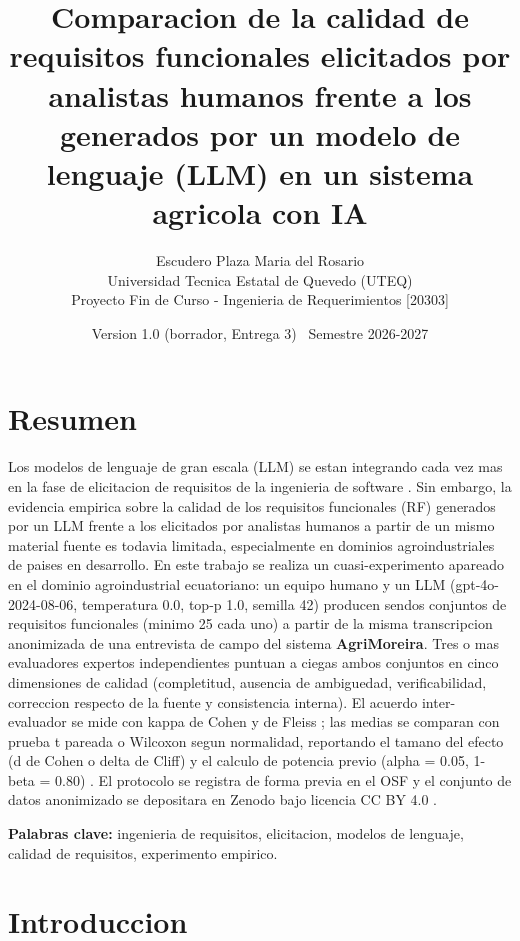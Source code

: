 \documentclass[11pt,a4paper]{article}
\title{\textbf{Comparacion de la calidad de requisitos funcionales elicitados
por analistas humanos frente a los generados por un modelo de lenguaje (LLM)
en un sistema agricola con IA}}
\author{Escudero Plaza Maria del Rosario\\[0.3em]
\small Universidad Tecnica Estatal de Quevedo (UTEQ)\\
\small Proyecto Fin de Curso - Ingenieria de Requerimientos [20303]}
\date{Version 1.0 (borrador, Entrega 3) \textbullet\ Semestre 2026-2027}
\begin{document}
\maketitle

\section*{Resumen}
Los modelos de lenguaje de gran escala (LLM) se estan integrando cada vez mas
en la fase de elicitacion de requisitos de la ingenieria de software
\cite{cheng2026,arora2024}. Sin embargo, la evidencia empirica sobre la
calidad de los requisitos funcionales (RF) generados por un LLM frente a los
elicitados por analistas humanos a partir de un mismo material fuente es
todavia limitada, especialmente en dominios agroindustriales de paises en
desarrollo. En este trabajo se realiza un cuasi-experimento apareado en el
dominio agroindustrial ecuatoriano: un equipo humano y un LLM (gpt-4o-2024-08-06,
temperatura 0.0, top-p 1.0, semilla 42) producen sendos conjuntos de
requisitos funcionales (minimo 25 cada uno) a partir de la misma transcripcion
anonimizada de una entrevista de campo del sistema \textbf{AgriMoreira}. Tres o
mas evaluadores expertos independientes puntuan a ciegas ambos conjuntos en
cinco dimensiones de calidad (completitud, ausencia de ambiguedad,
verificabilidad, correccion respecto de la fuente y consistencia interna). El
acuerdo inter-evaluador se mide con kappa de Cohen \cite{cohen1960} y de
Fleiss \cite{fleiss1971}; las medias se comparan con prueba t pareada o
Wilcoxon segun normalidad, reportando el tamano del efecto (d de Cohen o delta
de Cliff) y el calculo de potencia previo (alpha = 0.05, 1-beta = 0.80)
\cite{molleri2020}. El protocolo se registra de forma previa en el OSF
\cite{nosek2018} y el conjunto de datos anonimizado se depositara en Zenodo
bajo licencia CC BY 4.0 \cite{wilkinson2016}.

\noindent\textbf{Palabras clave:} ingenieria de requisitos, elicitacion,
modelos de lenguaje, calidad de requisitos, experimento empirico.

\section{Introduccion}
\end{document}
